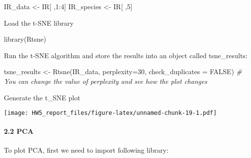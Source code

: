 \documentclass[
]{article}
\newenvironment{Shaded}{\begin{snugshade}}{\end{snugshade}}
\newcommand{\AttributeTok}[1]{\textcolor[rgb]{0.77,0.63,0.00}{#1}}
\newcommand{\CommentTok}[1]{\textcolor[rgb]{0.56,0.35,0.01}{\textit{#1}}}
\newcommand{\ConstantTok}[1]{\textcolor[rgb]{0.00,0.00,0.00}{#1}}
\newcommand{\DecValTok}[1]{\textcolor[rgb]{0.00,0.00,0.81}{#1}}
\newcommand{\FloatTok}[1]{\textcolor[rgb]{0.00,0.00,0.81}{#1}}
\newcommand{\FunctionTok}[1]{\textcolor[rgb]{0.00,0.00,0.00}{#1}}
\newcommand{\NormalTok}[1]{#1}
\newcommand{\OtherTok}[1]{\textcolor[rgb]{0.56,0.35,0.01}{#1}}
\newcommand{\SpecialCharTok}[1]{\textcolor[rgb]{0.00,0.00,0.00}{#1}}
\newcommand{\StringTok}[1]{\textcolor[rgb]{0.31,0.60,0.02}{#1}}
\begin{document}
\begin{Shaded}
\begin{Highlighting}[]
\NormalTok{IR\_data }\OtherTok{\textless{}{-}}\NormalTok{ IR[ ,}\DecValTok{1}\SpecialCharTok{:}\DecValTok{4}\NormalTok{]}
\NormalTok{IR\_species }\OtherTok{\textless{}{-}}\NormalTok{ IR[ ,}\DecValTok{5}\NormalTok{]}
\end{Highlighting}
\end{Shaded}

Load the t-SNE library

\begin{Shaded}
\begin{Highlighting}[]
\FunctionTok{library}\NormalTok{(Rtsne)}
\end{Highlighting}
\end{Shaded}

Run the t-SNE algorithm and store the results into an object called
tsne\_results:

\begin{Shaded}
\begin{Highlighting}[]
\NormalTok{tsne\_results }\OtherTok{\textless{}{-}} \FunctionTok{Rtsne}\NormalTok{(IR\_data, }\AttributeTok{perplexity=}\DecValTok{30}\NormalTok{, }\AttributeTok{check\_duplicates =} \ConstantTok{FALSE}\NormalTok{) }\CommentTok{\# You can change the value of perplexity and see how the plot changes}
\end{Highlighting}
\end{Shaded}

Generate the t\_SNE plot

\begin{Shaded}
\end{Shaded}

\texttt{[image: HW5\_report\_files/figure-latex/unnamed-chunk-19-1.pdf]}

\hypertarget{pca}{%
\paragraph{2.2 PCA}\label{pca}}

To plot PCA, first we need to import following library:
\end{document}
